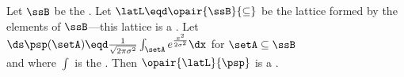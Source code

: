 
\begin{example}
Let $\ssB$ be the .
Let $\latL\eqd\opair{\ssB}{\subseteq}$ be the lattice formed by the elements of $\ssB$---this
lattice is a .
Let 
\\\indentx$\ds\psp(\setA)\eqd\frac{1}{\sqrt{2\pi\sigma^2}}\int_\setA e^{\frac{x^2}{2\sigma^2}}\dx$ for $\setA\subseteq\ssB$\\
and where $\int$ is the  .
Then $\opair{\latL}{\psp}$ is a . 
\end{example}

